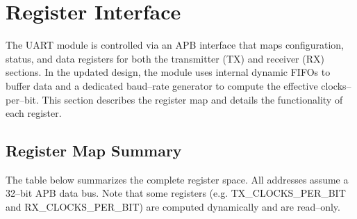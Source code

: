 \section{Register Interface}

The UART module is controlled via an APB interface that maps configuration, status, and data registers for both the transmitter (TX) and receiver (RX) sections. In the updated design, the module uses internal dynamic FIFOs to buffer data and a dedicated baud–rate generator to compute the effective clocks–per–bit. This section describes the register map and details the functionality of each register.

\subsection{Register Map Summary}

The table below summarizes the complete register space. All addresses assume a 32–bit APB data bus. Note that some registers (e.g. TX\_CLOCKS\_PER\_BIT and RX\_CLOCKS\_PER\_BIT) are computed dynamically and are read–only.

